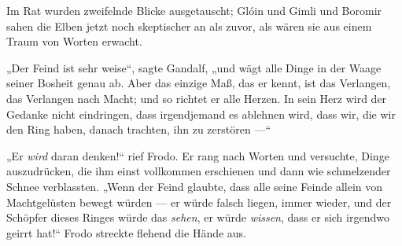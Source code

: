 Im Rat wurden zweifelnde Blicke ausgetauscht; Glóin und Gimli und Boromir sahen die Elben jetzt noch skeptischer an als zuvor, als wären sie aus einem Traum von Worten erwacht.

„Der Feind ist sehr weise“, sagte Gandalf, „und wägt alle Dinge in der Waage seiner Bosheit genau ab. Aber das einzige Maß, das er kennt, ist das Verlangen, das Verlangen nach Macht; und so richtet er alle Herzen. In sein Herz wird der Gedanke nicht eindringen, dass irgendjemand es ablehnen wird, dass wir, die wir den Ring haben, danach trachten, ihn zu zerstören —“

„Er \emph{wird} daran denken!“ rief Frodo. Er rang nach Worten und versuchte, Dinge auszudrücken, die ihm einst vollkommen erschienen und dann wie schmelzender Schnee verblassten.
„Wenn der Feind glaubte, dass alle seine Feinde allein von Machtgelüsten bewegt würden — er würde falsch liegen, immer wieder, und der Schöpfer dieses Ringes würde das \emph{sehen}, er würde \emph{wissen}, dass er sich irgendwo geirrt hat!“ Frodo streckte flehend die Hände aus.

